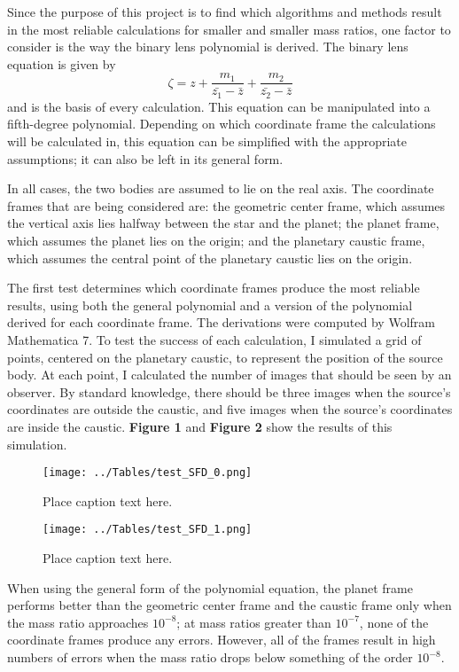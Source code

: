 \documentclass{article}
\begin{document}
Since the purpose of this project is to find which algorithms and
methods result in the most reliable calculations for smaller and
smaller mass ratios, one factor to consider is the way the binary
lens polynomial is derived. The binary lens equation is given by
\begin{equation}
\zeta = z + \frac{m_{1}}{\bar{z_{1}} - \bar{z}} +
\frac{m_{2}}{\bar{z_{2}} - \bar{z}}
\end{equation}
and is the basis of every calculation. This equation can be
manipulated into a fifth-degree polynomial. Depending on
which coordinate frame the calculations will be calculated in,
this equation can be simplified with the appropriate assumptions;
it can also be left in its general form.

In all cases, the two bodies are assumed to lie on the real axis.
The coordinate frames that are being considered are: the geometric
center frame, which assumes the vertical axis lies halfway between
the star and the planet; the planet frame, which assumes the planet
lies on the origin; and the planetary caustic frame, which assumes
the central point of the planetary caustic lies on the origin.

The first test determines which coordinate frames produce the most
reliable results, using both the general polynomial and a version
of the polynomial derived for each coordinate frame. The derivations
were computed by Wolfram Mathematica 7. To test the success of each
calculation, I simulated a grid of points, centered on the planetary 
caustic, to represent the position of the source body. At each point,
I calculated the number of images that should be seen by an observer.
By standard knowledge, there should be three images when the source's
coordinates are outside the caustic, and five images when the source's
coordinates are inside the caustic. \textbf{Figure 1} and 
\textbf{Figure 2} show the results of this simulation.

\begin{figure}
	\texttt{[image: ../Tables/test\_SFD\_0.png]}
	\caption{Place caption text here.}

	\vspace*{\floatsep}

	\texttt{[image: ../Tables/test\_SFD\_1.png]}
	\caption{Place caption text here.}
\end{figure}



When using the general form of the polynomial equation, the planet frame
performs better than the geometric center frame and the caustic frame only
when the mass ratio approaches $10^{-8}$; at mass ratios greater than $10^{-7}$,
none of the coordinate frames produce any errors. However, all of the frames
result in high numbers of errors when the mass ratio drops below something
of the order $10^{-8}$.
\end{document}
